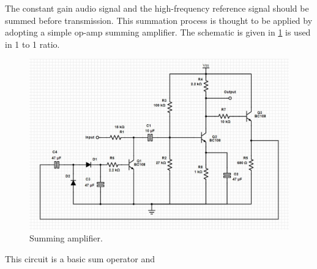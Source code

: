 \documentclass[a4paper,10pt]{IEEEtran}
\begin{document}
The constant gain audio signal and the high-frequency reference signal should be summed before transmission. This summation process is thought to be applied by adopting a simple op-amp summing amplifier.  The schematic is given in \ref{summing} is used in 1 to 1 ratio.
\begin{figure}[htbp!]
    \centering
    \includegraphics[width = 1\linewidth]{AGC Circuit.jpg}
    \caption{Summing amplifier.}
    \label{summing}
\end{figure} 
This circuit is a basic sum operator and 
\end{document}
